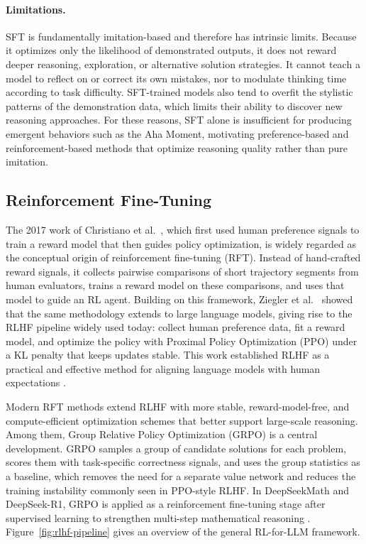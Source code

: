\documentclass{article}
\begin{document}
\paragraph{Limitations.}
SFT is fundamentally imitation-based and therefore has intrinsic limits. Because it optimizes only the likelihood of demonstrated outputs, it does not reward deeper reasoning, exploration, or alternative solution strategies. It cannot teach a model to reflect on or correct its own mistakes, nor to modulate thinking time according to task difficulty. SFT-trained models also tend to overfit the stylistic patterns of the demonstration data, which limits their ability to discover new reasoning approaches. For these reasons, SFT alone is insufficient for producing emergent behaviors such as the Aha Moment, motivating preference-based and reinforcement-based methods that optimize reasoning quality rather than pure imitation.

\subsection{Reinforcement Fine-Tuning}

The 2017 work of Christiano et al.\ \cite{christiano2017deep}, which first used human preference signals to train a reward model that then guides policy optimization, is widely regarded as the conceptual origin of reinforcement fine-tuning (RFT). Instead of hand-crafted reward signals, it collects pairwise comparisons of short trajectory segments from human evaluators, trains a reward model on these comparisons, and uses that model to guide an RL agent. Building on this framework, Ziegler et al.\ \cite{ziegler2019fine} showed that the same methodology extends to large language models, giving rise to the RLHF pipeline widely used today: collect human preference data, fit a reward model, and optimize the policy with Proximal Policy Optimization (PPO) under a KL penalty that keeps updates stable. This work established RLHF as a practical and effective method for aligning language models with human expectations \cite{ouyang2022rlhf, bai2022training}.

Modern RFT methods extend RLHF with more stable, reward-model-free, and compute-efficient optimization schemes that better support large-scale reasoning. Among them, Group Relative Policy Optimization (GRPO) \cite{shao2024deepseekmath} is a central development. GRPO samples a group of candidate solutions for each problem, scores them with task-specific correctness signals, and uses the group statistics as a baseline, which removes the need for a separate value network and reduces the training instability commonly seen in PPO-style RLHF. In DeepSeekMath and DeepSeek-R1, GRPO is applied as a reinforcement fine-tuning stage after supervised learning to strengthen multi-step mathematical reasoning \cite{shao2024deepseekmath, deepseekr1}. Figure~\ref{fig:rlhf-pipeline} gives an overview of the general RL-for-LLM framework.
\end{document}
